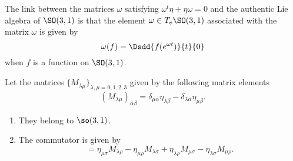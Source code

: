 \begin{normaltext}
    The link between the matrices \( \omega\) satisfying \( \omega^t\eta+\eta\omega=0\) and the authentic Lie algebra of \( \SO(3,1)\) is that the element \( \omega\in T_e\SO(3,1)\) associated with the matrix \( \omega\) is given by
    \begin{equation}
        \omega(f)=\Dsdd{ f( e^{\omega t}) }{t}{0}
    \end{equation}
    when \( f\) is a function on \( \SO(3,1)\).
\end{normaltext}

\begin{lemma}        \label{LEMooVAYBooHcPKHU}
    Let the matrices \( \{ M_{\lambda\mu} \}_{\lambda,\mu=0,1,2,3}\) given by the following matrix elements
    \begin{equation}
        (M_{\lambda\mu})_{\alpha\beta}=\delta_{\mu\alpha}\eta_{\lambda\beta}-\delta_{\lambda\alpha}\eta_{\mu\beta}.
    \end{equation}
    \begin{enumerate}
        \item
    They belong to \( \so(3,1)\).
\item
    The commutator is given by
    \begin{equation}
        [M_{\lambda\mu}, M_{\rho\sigma}]=\eta_{\mu\sigma}M_{\lambda\rho}-\eta_{\mu\rho}M_{\lambda\sigma}+\eta_{\lambda\rho}M_{\mu\sigma}-\eta_{\lambda\sigma}M_{\mu\rho}.
    \end{equation}
    \end{enumerate}
\end{lemma}

